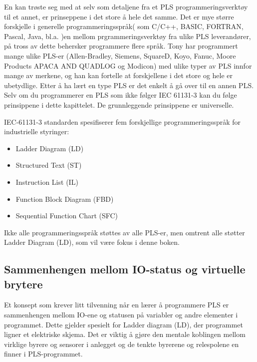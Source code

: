 En kan trøste seg med at selv som detaljene fra et PLS programmeringsverktøy til et annet, er prinseppene i det store å hele det samme. Det er mye større forskjelle i generelle programmeringsspråk( som C/C++, BASIC, FORTRAN, Pascal, Java, bl.a. )en mellom prgrammeringsverktøy fra ulike PLS leverandører, på tross av dette behersker programmere flere språk. Tony har programmert mange ulike PLS-er (Allen-Bradley, Siemens, SquareD, Koyo, Fanuc, Moore Products APACA AND QUADLOG og Modicon) med ulike typer av PLS innfor mange av merkene, og han kan fortelle at forskjellene i det store og hele er ubetydlige. Etter å ha lært en type PLS er det enkelt å gå over til en annen PLS. Selv om du programmerer en PLS som ikke følger IEC 61131-3 kan du følge prinsippene i dette kapittelet. De grunnleggende prinsippene er universelle. 


IEC-61131-3 standarden spesifiserer fem forskjellige programmeringsspråk for industrielle styringer:


\begin{itemize}
\item Ladder Diagram (LD)
\item Structured Text (ST)
\item Instruction List (IL)
\item Function Block Diagram (FBD)
\item Sequential Function Chart (SFC)
\end{itemize}

Ikke alle programmeringsspråk støttes av alle PLS-er, men omtrent alle støtter Ladder Diagram (LD), som vil være fokus i denne boken. 







\filbreak
\subsection{Sammenhengen mellom IO-status og virtuelle brytere}

Et konsept som krever litt tilvenning når en lærer å programmere PLS er sammenhengen mellom IO-ene og statusen på variabler og andre elementer i programmet. Dette gjelder spesielt for Ladder diagram (LD), der programmet ligner et elektriske skjema. Det er viktig å gjøre den mentale koblingen mellom virklige byrere og sensorer i anlegget og de tenkte byrerene og relespolene en finner i PLS-programmet. 

